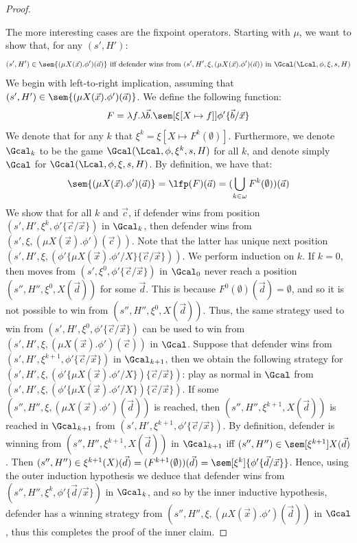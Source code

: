 \begin{proof}
\begin{itemize}
	\end{itemize}
	The more interesting cases are the fixpoint operators.
	Starting with $\mu$, we want to show that, for any $(s', H')$:
	\[
	(s', H')\in \sem{(\mu X(\vec x).\phi')(\vec a)} \text{ iff defender wins from } (s', H', \xi, (\mu X(\vec x).\phi')(\vec a)) \text{ in } \Gcal(\Lcal, \phi, \xi, s, H)
	\]
	We begin with left-to-right implication, assuming that $(s', H') \in \sem{(\mu X(\vec x).\phi')(\vec a)}$. 
	We define the following function:%
	\[
	F = \lambda f.\lambda \vec b.\sem[{\xi[X \mapsto f]}]{\phi'\{\vec b / \vec x\}}
	\]
	We denote that for any $k$ that $\xi^k = \xi[X \mapsto F^k(\emptyset)]$.
	Furthermore, we denote $\Gcal_{k}$ to be the game $\Gcal(\Lcal, \phi, \xi^k, s, H)$ for all $k$, and denote simply $\Gcal$ for $\Gcal(\Lcal, \phi, \xi, s, H)$.
	By definition, we have that:
	\[
	\sem{(\mu X(\vec x).\phi')(\vec a)} = \lfp(F)(\vec a) = (\bigcup_{k \in \omega} F^k(\emptyset))(\vec a)
	\]
	We show that for all $k$ and $\vec c$, if defender wins from position $(s', H', \xi^k, \phi'\{\vec c/\vec x\})$ in $\Gcal_k$,
	then defender wins from $(s', \xi, (\mu X(\vec x).\phi')(\vec c))$.
	Note that the latter has unique next position $(s', H', \xi, (\phi'\{\mu X(\vec x).\phi' / X\}\{\vec c / \vec x\}))$. 
	We perform induction on $k$. 
	If $k = 0$, then moves from $(s', \xi^0, \phi'\{\vec c / \vec x\})$ in $\Gcal_0$ never reach a position $(s'',H'', \xi^0, X(\vec d))$ for some $\vec d$. 
	This is because $F^0(\emptyset)(\vec d) = \emptyset$, and so it is not possible to win from $(s'', H'', \xi^0, X(\vec d))$.
	Thus, the same strategy used to win from $(s', H', \xi^0, \phi'\{\vec c / \vec x\})$ can be used to win from $(s', H', \xi, (\mu X(\vec x).\phi')(\vec c))$ in $\Gcal$.
	Suppose that defender wins from $(s', H', \xi^{k + 1}, \phi'\{\vec c / \vec x\})$ in $\Gcal_{k + 1}$, then we obtain the following strategy for $(s', H', \xi, (\phi'\{\mu X(\vec x).\phi' / X\})\{\vec c / \vec x\})$:
	play as normal in $\Gcal$ from $(s', H', \xi, (\phi'\{\mu X(\vec x).\phi' / X\})\{\vec c / \vec x\})$.
	If some $(s'', H'', \xi, (\mu X(\vec x).\phi')(\vec d))$ is reached, then $(s'', H'', \xi^{k + 1}, X(\vec d))$ is reached in $\Gcal_{k + 1}$ from $(s', H', \xi^{k+1}, \phi'\{\vec c / \vec x\})$. 
	By definition, defender is winning from $(s'', H'', \xi^{k + 1}, X(\vec d))$ in $\Gcal_{k+1}$ iff $(s'', H'')\in \sem[\xi^{k + 1}]{X(\vec d)}$.
	Then $(s'', H'') \in \xi^{k + 1}(X)(\vec d) = (F^{k + 1}(\emptyset))(\vec d) = \sem[\xi^k]{\phi'\{\vec d / \vec x\}}$.
	Hence, using the outer induction hypothesis we deduce that defender wins from $(s'', H'',\xi^k, \phi'\{\vec d / \vec x\})$ in $\Gcal_k$, and so by the inner inductive hypothesis, defender has a winning strategy from $(s'', H'', \xi, (\mu X(\vec x).\phi')(\vec d))$ in $\Gcal$, thus this completes the proof of the inner claim.

\end{proof}
